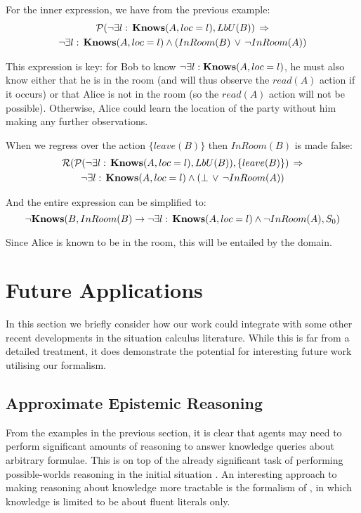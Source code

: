 For the inner expression, we have from the previous example:\begin{multline*}
\mathcal{P}(\neg\exists l:\,\mathbf{Knows}(A,loc=l),LbU(B))\,\Rightarrow\\
\neg\exists l:\,\mathbf{Knows}(A,loc=l)\wedge\left(InRoom(B)\,\vee\,\neg InRoom(A)\right)\end{multline*}


This expression is key: for Bob to know $\neg\exists l:\mathbf{Knows}(A,loc=l)$,
he must also know either that he is in the room (and will thus observe
the $read(A)$ action if it occurs) or that Alice is not in the room
(so the $read(A)$ action will not be possible). Otherwise, Alice
could learn the location of the party without him making any further
observations.

When we regress over the action $\{leave(B)\}$ then $InRoom(B)$
is made false:\begin{multline*}
\mathcal{R}(\mathcal{P}(\neg\exists l:\,\mathbf{Knows}(A,loc=l),LbU(B)),\{leave(B)\})\,\Rightarrow\\
\neg\exists l:\,\mathbf{Knows}(A,loc=l)\wedge\left(\bot\,\vee\,\neg InRoom(A)\right)\end{multline*}


And the entire expression can be simplified to:\[
\neg\mathbf{Knows}(B,InRoom(B)\rightarrow\neg\exists l:\,\mathbf{Knows}(A,loc=l)\wedge\neg InRoom(A),S_{0})\]


Since Alice is known to be in the room, this will be entailed by the
domain.


\section{Future Applications\label{sec:Knowledge:Advances}}

In this section we briefly consider how our work could integrate with
some other recent developments in the situation calculus literature.
While this is far from a detailed treatment, it does demonstrate the
potential for interesting future work utilising our formalism.


\subsection{Approximate Epistemic Reasoning}

From the examples in the previous section, it is clear that agents
may need to perform significant amounts of reasoning to answer knowledge
queries about arbitrary formulae. This is on top of the already significant
task of performing possible-worlds reasoning in the initial situation
\citep{Petrick06thesis}. An interesting approach to making reasoning
about knowledge more tractable is the formalism of \citet{demolombe00tractable_sc_belief},
in which knowledge is limited to be about fluent literals only.

